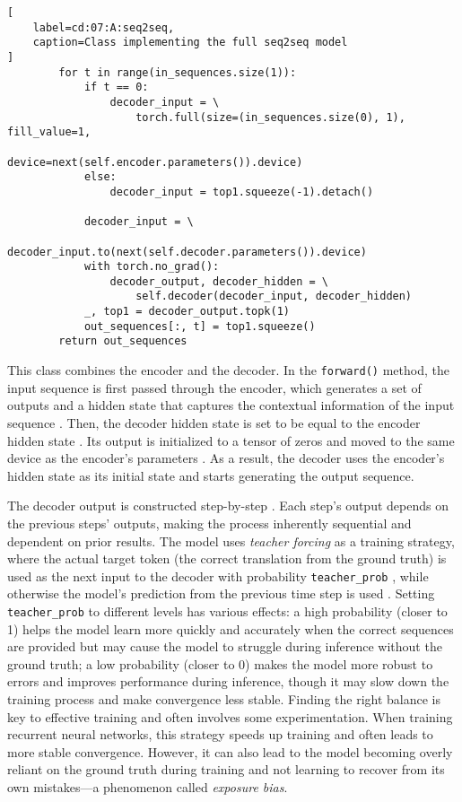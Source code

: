 \begin{lstlisting}[
    label=cd:07:A:seq2seq,
    caption=Class implementing the full seq2seq model
]
        for t in range(in_sequences.size(1)):
            if t == 0:
                decoder_input = \
                    torch.full(size=(in_sequences.size(0), 1), fill_value=1,
                               device=next(self.encoder.parameters()).device)
            else:
                decoder_input = top1.squeeze(-1).detach()

            decoder_input = \ 
                decoder_input.to(next(self.decoder.parameters()).device)
            with torch.no_grad():
                decoder_output, decoder_hidden = \
                    self.decoder(decoder_input, decoder_hidden)
            _, top1 = decoder_output.topk(1)
            out_sequences[:, t] = top1.squeeze()
        return out_sequences
\end{lstlisting}
This class combines the encoder and the decoder.
In the \lstinline{forward()} method, the input sequence is first passed through the encoder, which generates a set of outputs and a hidden state that captures the contextual information of the input sequence .
Then, the decoder hidden state is set to be equal to the encoder hidden state . Its output is initialized to a tensor of zeros and moved to the same device as the encoder's parameters .
As a result, the decoder uses the encoder’s hidden state as its initial state and starts generating the output sequence. 

The decoder output is constructed step-by-step . Each step's output depends on the previous steps' outputs, making the process inherently sequential and dependent on prior results. The model uses \emph{teacher forcing} as a training strategy, where the actual target token (the correct translation from the ground truth) is used as the next input to the decoder with probability \lstinline{teacher_prob} \wingding{4}, while otherwise the model’s prediction from the previous time step is used .
Setting \lstinline{teacher_prob} to different levels has various effects: a high probability (closer to 1) helps the model learn more quickly and accurately when the correct sequences are provided but may cause the model to struggle during inference without the ground truth; a low probability (closer to 0) makes the model more robust to errors and improves performance during inference, though it may slow down the training process and make convergence less stable. Finding the right balance is key to effective training and often involves some experimentation.
When training recurrent neural networks, this strategy speeds up training and often leads to more stable convergence. However, it can also lead to the model becoming overly reliant on the ground truth during training and not learning to recover from its own mistakes---a phenomenon called \emph{exposure bias}.

